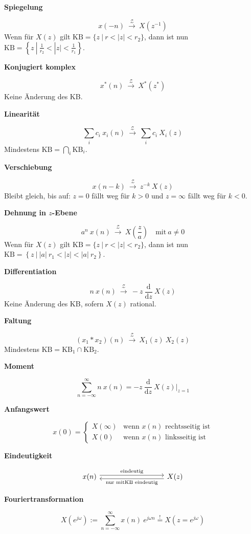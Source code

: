 \documentclass[10pt,a4paper]{article}
\newcommand{\fancyformula}[2]{
	\small\raggedright{\sffamily\textbf{#1}}
	#2
}
\newcommand{\ztransform}{
	~\xrightarrow{~\mathcal{Z}~}~
}
\begin{document}
\begin{multicols}{2}
	\fancyformula{Spiegelung}{
		\[ x(-n) \ztransform X \left(z^{-1} \right) \]
		\footnotesize Wenn für $X(z)$ gilt $\mathrm{KB} = \{ z ~ | ~ r < |z| < r_2 \}$, dann ist nun $\mathrm{KB} = \left \{ z ~ | ~ \frac{1}{r_2} < |z| < \frac{1}{r_1} \right \}$.
		\vspace{0.5em}
	}

	\fancyformula{Konjugiert komplex}{
		\[ x^{*}(n)\ztransform X^{*}(z^{*}) \]
		\footnotesize Keine Änderung des KB.
		\vspace{0.5em}
	}

	\fancyformula{Linearität}{
		\[ \sum_i c_i ~ x_i(n) \ztransform \sum_i c_i ~ X_i(z) \]
		\footnotesize Mindestens $\mathrm{KB} = \bigcap_i \mathrm{KB}_i$.
		\vspace{0.5em}
	}

	\fancyformula{Verschiebung}{
		\[ x(n-k) \ztransform z^{-k} ~ X(z) \]
		\footnotesize Bleibt gleich, bis auf: $z = 0$ fällt weg für $k > 0$ und $z = \infty$ fällt weg für $k < 0$.
		\vspace{0.5em}
	}

	\fancyformula{Dehnung in $z$-Ebene}{
		\[ a^n ~ x(n) \ztransform X\left(\frac{z}{a}\right) \quad \text{mit} ~ a \neq 0 \]
		\footnotesize Wenn für $X(z)$ gilt $\mathrm{KB} = \{ z ~ | ~ r < |z| < r_2 \}$, dann ist nun $\mathrm{KB} = \left \{ z ~ | ~ |a| ~ r_1 < |z| < |a| ~ r_2 \right \}$.
		\vspace{0.5em}
	}

	\fancyformula{Differentiation}{
		\[ n ~ x(n) \ztransform -z ~ \frac{\mathrm d}{\mathrm dz} ~ X(z) \]
		\footnotesize Keine Änderung des KB, sofern $X(z)$ rational.
		\vspace{0.5em}
	}

	\fancyformula{Faltung}{
		\[ (x_1 * x_2)(n) \ztransform X_{1}(z) ~ X_{2}(z)\]
		\footnotesize Mindestens $\mathrm{KB} = \mathrm{KB}_1 \cap \mathrm{KB}_2$.
		\vspace{0.5em}
	}

	\fancyformula{Moment}{
		\[ \sum_{n=-\infty}^{\infty} n ~ x(n) = -z ~ \frac{\mathrm d}{\mathrm dz} ~ X(z) \bigg|_{z=1} \]
	}

	\fancyformula{Anfangswert}{
		\[
			x(0) = \begin{cases}
				X(\infty) & \text{wenn $x(n)$ rechtsseitig ist} \\
				X(0) & \text{wenn $x(n)$ linksseitig ist}
			\end{cases}
		\]
	}

	{\small\raggedright\sffamily\textbf{Eindeutigkeit}}
	\[
		\begin{tikzcd}[every arrow/.append style={shift left}, column sep = 9em]
			x(n) \arrow{r}{\text{eindeutig}} & X(z) \arrow{l}{\text{nur mit\newline KB eindeutig}}
		\end{tikzcd}
	\]

	\fancyformula{Fouriertransformation}{
		\[ X(e^{j\omega}) := \sum_{n = -\infty}^{\infty} x(n) ~ e^{j\omega n} \overset{!}{=} X(z = e^{j\omega}) \]
	}
\end{multicols}
\end{document}
